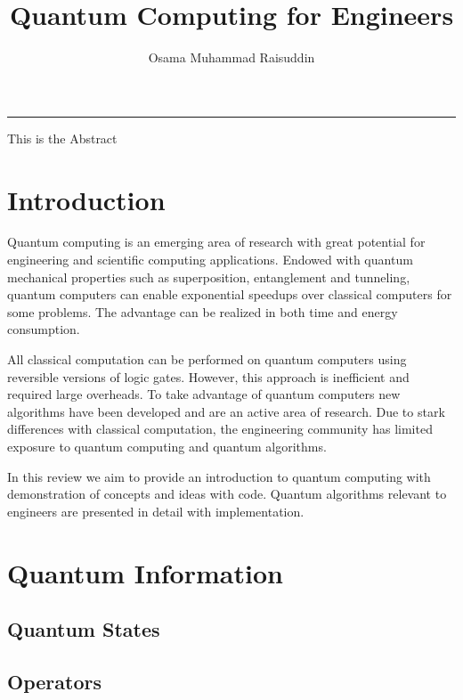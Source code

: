 \documentclass{article}
\title{Quantum Computing for Engineers}
\author{Osama Muhammad Raisuddin}
\begin{document}
\maketitle

\tableofcontents


  \vspace{10pt}
    \hrule
  \vspace{10pt}
This is the Abstract 
  \vspace{10pt}








\section{Introduction}


Quantum computing is an emerging area of research with great potential for engineering and scientific computing applications. Endowed with quantum mechanical properties such as superposition, entanglement and tunneling, quantum computers can enable exponential speedups over classical computers for some problems. The advantage can be realized in both time and energy consumption. 

All classical computation can be performed on quantum computers using reversible versions of logic gates. However, this approach is inefficient and required large overheads. To take advantage of quantum computers new algorithms have been developed and are an active area of research. Due to stark differences with classical computation, the engineering community has limited exposure to quantum computing and quantum algorithms. 

In this review we aim to provide an introduction to quantum computing with demonstration of concepts and ideas with code. Quantum algorithms relevant to engineers are presented in detail with implementation.




\section{Quantum Information}

\subsection{Quantum States}

\subsection{Operators}
\end{document}
